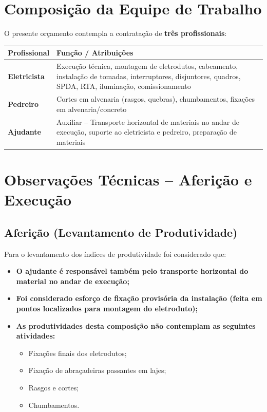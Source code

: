 \documentclass[12pt,a4paper]{article}
\renewenvironment{table}%
{\begin{center}%
\scriptsize%
\addtolength{\tabcolsep}{-2pt}%
}%
{\end{center}}
\begin{document}
\pagebreak

\section{Composição da Equipe de Trabalho}

O presente orçamento contempla a contratação de \textbf{três profissionais}:

\begin{table}
\centering
\begin{tabular}{lp{10cm}}
\toprule
\textbf{Profissional} & \textbf{Função / Atribuições} \\
\midrule
\textbf{Eletricista} & Execução técnica, montagem de eletrodutos, cabeamento, instalação de tomadas, interruptores, disjuntores, quadros, SPDA, RTA, iluminação, comissionamento \\
\midrule
\textbf{Pedreiro} & Cortes em alvenaria (rasgos, quebras), chumbamentos, fixações em alvenaria/concreto \\
\midrule
\textbf{Ajudante} & Auxiliar -- Transporte horizontal de materiais no andar de execução, suporte ao eletricista e pedreiro, preparação de materiais \\
\bottomrule
\end{tabular}
\end{table}

\section{Observações Técnicas -- Aferição e Execução}

\subsection{Aferição (Levantamento de Produtividade)}

Para o levantamento dos índices de produtividade foi considerado que:

\begin{itemize}
\item \textbf{O ajudante é responsável também pelo transporte horizontal do material no andar de execução;}
\item \textbf{Foi considerado esforço de fixação provisória da instalação (feita em pontos localizados para montagem do eletroduto);}
\item \textbf{As produtividades desta composição não contemplam as seguintes atividades:}
\begin{itemize}
\item Fixações finais dos eletrodutos;
\item Fixação de abraçadeiras passantes em lajes;
\item Rasgos e cortes;
\item Chumbamentos.
\end{itemize}
\end{itemize}
\end{document}
